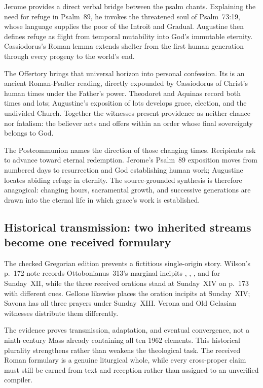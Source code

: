 Jerome provides a direct verbal bridge between the psalm chants. Explaining the
need for refuge in Psalm~89, he invokes the threatened soul of Psalm~73:19,
whose language supplies the poor of the Introit and Gradual. Augustine then
defines refuge as flight from temporal mutability into God's immutable
eternity. Cassiodorus's Roman lemma extends shelter from the first human
generation through every progeny to the world's end.

The Offertory brings that universal horizon into personal confession. Its
 is an ancient Roman-Psalter reading, directly expounded by
Cassiodorus of Christ's human times under the Father's power. Theodoret and
Aquinas record both times and lots; Augustine's exposition of lots develops
grace, election, and the undivided Church. Together the witnesses present
providence as neither chance nor fatalism: the believer acts and offers within
an order whose final sovereignty belongs to God.

The Postcommunion names the direction of those changing times. Recipients ask
to advance toward eternal redemption. Jerome's Psalm~89 exposition moves from
numbered days to resurrection and God establishing human work; Augustine
locates abiding refuge in eternity. The source-grounded synthesis is therefore
anagogical: changing hours, sacramental growth, and successive generations are
drawn into the eternal life in which grace's work is established.

\subsection*{Historical transmission: two inherited streams become one received formulary}

The checked Gregorian edition prevents a fictitious single-origin story.
Wilson's p.~172 note records Ottobonianus~313's marginal incipits
, , , and  for Sunday~XII, while the three received orations stand at Sunday~XIV on
p.~173 with different cues. Gellone likewise places the oration incipits at
Sunday~XIV; Savona has all three prayers under Sunday~XIII. Verona and Old
Gelasian witnesses distribute them differently.

The evidence proves transmission, adaptation, and eventual convergence, not a
ninth-century Mass already containing all ten 1962 elements. This historical
plurality strengthens rather than weakens the theological task. The received
Roman formulary is a genuine liturgical whole, while every cross-proper claim
must still be earned from text and reception rather than assigned to an
unverified compiler.
